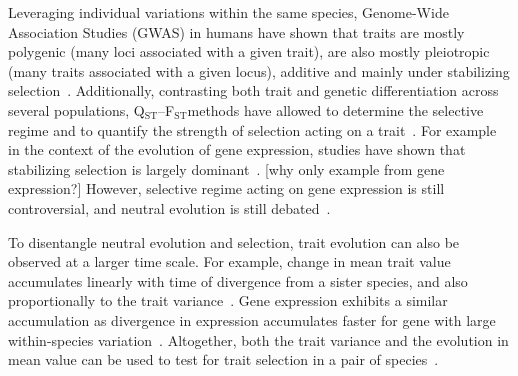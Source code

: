 \documentclass{article}
\newcommand{\QstFst}{Q$_\text{ST}$--F$_\text{ST}$}
\begin{document}
Leveraging individual variations within the same species, Genome-Wide Association Studies (GWAS) in humans have shown that traits are mostly polygenic (many loci associated with a given trait), are also mostly pleiotropic (many traits associated with a given locus), additive and mainly under stabilizing selection~\parencite{simons_population_2018, sella_thinking_2019}.
Additionally, contrasting both trait and genetic differentiation across several populations, \QstFst methods have allowed to determine the selective regime and to quantify the strength of selection acting on a trait~\parencite{martin_multivariate_2008, leinonen_qst_2013}.
For example in the context of the evolution of gene expression, studies have shown that stabilizing selection is largely dominant~\parencite{whitehead_neutral_2006, gilad_natural_2006}. [why only example from gene expression?]
However, selective regime acting on gene expression is still controversial, and neutral evolution is still debated~\parencite{signor_evolution_2018, price_detecting_2022}.


To disentangle neutral evolution and selection, trait evolution can also be observed at a larger time scale.
For example, change in mean trait value accumulates linearly with time of divergence from a sister species, and also proportionally to the trait variance~\parencite{lande_genetic_1980, turelli_heritable_1984}.
Gene expression exhibits a similar accumulation as divergence in expression accumulates faster for gene with large within-species variation~\parencite{khaitovich_neutral_2004}.
Altogether, both the trait variance and the evolution in mean value can be used to test for trait selection in a pair of species~\parencite{walsh_evolution_2018}.
\end{document}
